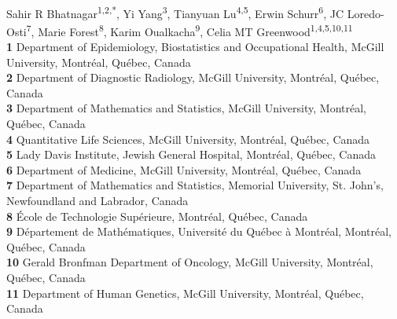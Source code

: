 \documentclass[10pt,letterpaper]{article}
\begin{document}
\vspace*{0.2in}

\begin{flushleft}
{\Large
\textbf{} %
}
\newline
\\
Sahir R Bhatnagar\textsuperscript{1,2,*},
Yi Yang\textsuperscript{3},
Tianyuan Lu\textsuperscript{4,5},
Erwin Schurr\textsuperscript{6},
JC Loredo-Osti\textsuperscript{7},
Marie Forest\textsuperscript{8},
Karim Oualkacha\textsuperscript{9},
Celia MT Greenwood\textsuperscript{1,4,5,10,11}
\\
\bigskip
\textbf{1} Department of Epidemiology, Biostatistics and Occupational Health, McGill University, Montréal, Québec, Canada
\\
\textbf{2} Department of Diagnostic Radiology, McGill University, Montréal, Québec, Canada
\\
\textbf{3} Department of Mathematics and Statistics, McGill University, Montréal, Québec, Canada
\\
\textbf{4} Quantitative Life Sciences, McGill University, Montréal, Québec, Canada
\\
\textbf{5} Lady Davis Institute, Jewish General Hospital, Montréal, Québec, Canada
\\
\textbf{6} Department of Medicine, McGill University, Montréal, Québec, Canada
\\
\textbf{7} Department of Mathematics and Statistics, Memorial University, St. John's, Newfoundland and Labrador, Canada
\\
\textbf{8} École de Technologie Supérieure, Montréal, Québec, Canada
\\
\textbf{9} Département de Mathématiques, Université du Québec à Montréal, Montréal, Québec, Canada
\\
\textbf{10} Gerald Bronfman Department of Oncology, McGill University, Montréal, Québec, Canada
\\
\textbf{11} Department of Human Genetics, McGill University, Montréal, Québec, Canada

\bigskip


\end{flushleft}
\end{document}
